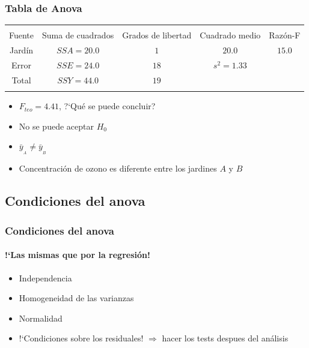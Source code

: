 \documentclass[gray,handout,mathserif]{beamer}
\begin{document}
\begin{frame}[label=anov16]
   \frametitle{Tabla de Anova}
   \small
   \renewcommand{\arraystretch}{1.3}
   \begin{table}
      \begin{tabular}{ccccc}
         \firsthline
         \\[-2ex]
         \parbox[c]{9ex}{\centering Fuente} & \parbox[c]{10ex}{\centering Suma de cuadrados} & \parbox[c]{10ex}{\centering Grados de libertad} & \parbox[c]{9ex}{\centering Cuadrado medio} & \parbox[c]{9ex}{\centering Raz\'on-F} \\[2ex]
         \hline
         Jard\'in & $SSA=20.0$ & $1 $ & $20.0$         & $15.0$ \\
         Error    & $SSE=24.0$ & $18$ & $s^2=1.33$ &      \\
         Total    & $SSY=44.0$ & $19$ &              &      \\
         \lasthline
      \end{tabular}
   \end{table}

   \begin{itemize}[<2-| visible@+(1)-| handout:1>]
      \item $F_{teo}=4.41$, ?`Qu\'e se puede concluir?
      \item No se puede aceptar $H_0$
      \item $\bar{y}_{_A}\neq\bar{y}_{_B}$
      \item Concentraci\'on de ozono es diferente entre los jardines $A$ y $B$
   \end{itemize}
\end{frame}%


\subsection[Condiciones]{Condiciones del anova}

\begin{frame}[label=anovcond]
   \frametitle{Condiciones del anova}
   \framesubtitle{!`Las mismas que por la regresi\'on!}
    \begin{itemize}
      \item Independencia
      \item Homogeneidad de las varianzas
      \item Normalidad
      \medskip
      \item[] !`Condiciones sobre los residuales! $\Rightarrow$ hacer los tests despues del an\'alisis
   \end{itemize}
\end{frame}%
\end{document}
